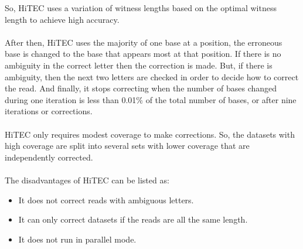 \documentclass[12pt,openany]{llncs}
\begin{document}
So, HiTEC uses a variation of witness lengths based on the optimal witness length to achieve high accuracy.
\\
\\
After then, HiTEC uses the majority of one base at a position, the erroneous base is changed to the base that appears most at that position. If there is no ambiguity in the correct letter then the correction is made. But, if there is ambiguity, then the next two letters are checked in order to decide how to correct the read. And finally, it stops correcting when the number of bases changed during one iteration is less than 0.01\% of the total number of bases, or after nine iterations or corrections.
\\
\\
HiTEC only requires modest coverage to make corrections. So, the datasets with high coverage are split into several sets with lower coverage that are independently corrected. 
\\
\\
The disadvantages of HiTEC can be listed as:
\begin{itemize}
	\item It does not correct reads with ambiguous letters.
	\item It can only correct datasets if the reads are all the same length.
	\item It does not run in parallel mode.
\end{itemize}
\end{document}
